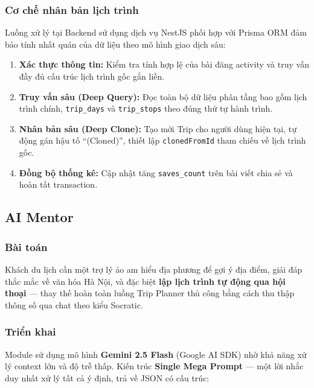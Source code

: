 \documentclass[12pt,a4paper]{article}
\begin{document}
\subsubsection{Cơ chế nhân bản lịch trình}

Luồng xử lý tại Backend sử dụng dịch vụ NestJS phối hợp với Prisma ORM đảm
bảo tính nhất quán của dữ liệu theo mô hình giao dịch sâu:

\begin{enumerate}
  \item \textbf{Xác thực thông tin:} Kiểm tra tính hợp lệ của bài đăng
        activity và truy vấn đầy đủ cấu trúc lịch trình gốc gắn liền.
  \item \textbf{Truy vấn sâu (Deep Query):} Đọc toàn bộ dữ liệu phân tầng
        bao gồm lịch trình chính, \texttt{trip\_days} và \texttt{trip\_stops}
        theo đúng thứ tự hành trình.
  \item \textbf{Nhân bản sâu (Deep Clone):} Tạo mới Trip cho người dùng
        hiện tại, tự động gán hậu tố ``(Cloned)'', thiết lập
        \texttt{clonedFromId} tham chiếu về lịch trình gốc.
  \item \textbf{Đồng bộ thống kê:} Cập nhật tăng \texttt{saves\_count} trên
        bài viết chia sẻ và hoàn tất transaction.
\end{enumerate}

\subsection{AI Mentor}

\subsubsection{Bài toán}

Khách du lịch cần một trợ lý ảo am hiểu địa phương để gợi ý địa điểm, giải đáp
thắc mắc về văn hóa Hà Nội, và đặc biệt \textbf{lập lịch trình tự động qua
hội thoại} --- thay thế hoàn toàn luồng Trip Planner thủ công bằng cách thu
thập thông số qua chat theo kiểu Socratic.

\subsubsection{Triển khai}

Module sử dụng mô hình \textbf{Gemini 2.5 Flash} (Google AI SDK) nhờ khả năng
xử lý context lớn và độ trễ thấp. Kiến trúc \textbf{Single Mega Prompt} --- một
lời nhắc duy nhất xử lý tất cả ý định, trả về JSON có cấu trúc:
\end{document}
